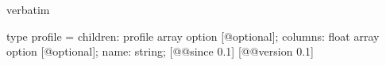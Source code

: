 \begin{camlexample}{verbatim}
\begin{caml}
\begin{camlinput}
type profile = {
  children: profile array option [@optional];
  columns: float array option [@optional];
  name: string;
} [@@since 0.1]
[@@version 0.1]
\end{camlinput}
\end{caml}
\end{camlexample}
